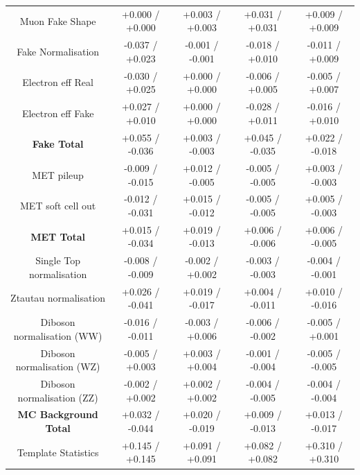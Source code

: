 \begin{table}[htbp]
\begin{center}
\begin{tabular}{|c|c|c|c|c|}
   \hline
   Muon Fake Shape                       &  +0.000   / +0.000   & +0.003   / +0.003   & +0.031   / +0.031   & +0.009   / +0.009   \\
   Fake Normalisation                    &  -0.037   / +0.023   & -0.001   / -0.001   & -0.018   / +0.010   & -0.011   / +0.009   \\
   Electron eff Real                     &  -0.030   / +0.025   & +0.000   / +0.000   & -0.006   / +0.005   & -0.005   / +0.007   \\
   Electron eff Fake                     &  +0.027   / +0.010   & +0.000   / +0.000   & -0.028   / +0.011   & -0.016   / +0.010   \\
   \hline
   \textbf{Fake Total}                   &  +0.055   / -0.036   & +0.003   / -0.003   & +0.045   / -0.035   & +0.022   / -0.018   \\
   \hline
   MET pileup                            &  -0.009   / -0.015   & +0.012   / -0.005   & -0.005   / -0.005   & +0.003   / -0.003   \\
   MET soft cell out                     &  -0.012   / -0.031   & +0.015   / -0.012   & -0.005   / -0.005   & +0.005   / -0.003   \\
   \hline
   \textbf{MET Total}                    &  +0.015   / -0.034   & +0.019   / -0.013   & +0.006   / -0.006   & +0.006   / -0.005   \\
   \hline
   Single Top normalisation              &  -0.008   / -0.009   & -0.002   / +0.002   & -0.003   / -0.003   & -0.004   / -0.001   \\
   Ztautau normalisation                 &  +0.026   / -0.041   & +0.019   / -0.017   & +0.004   / -0.011   & +0.010   / -0.016   \\
   Diboson normalisation (WW)            &  -0.016   / -0.011   & -0.003   / +0.006   & -0.006   / -0.002   & -0.005   / +0.001   \\
   Diboson normalisation (WZ)            &  -0.005   / +0.003   & +0.003   / +0.004   & -0.001   / -0.004   & -0.005   / -0.005   \\
   Diboson normalisation (ZZ)            &  -0.002   / +0.002   & +0.002   / +0.002   & -0.004   / -0.005   & -0.004   / -0.004   \\
   \hline
   \textbf{MC Background Total}          &  +0.032   / -0.044   & +0.020   / -0.019   & +0.009   / -0.013   & +0.013   / -0.017   \\
   \hline
   Template Statistics                   &  +0.145   / +0.145   & +0.091   / +0.091   & +0.082   / +0.082   & +0.310   / +0.310   \\

\end{tabular}
\end{center}
\end{table}
